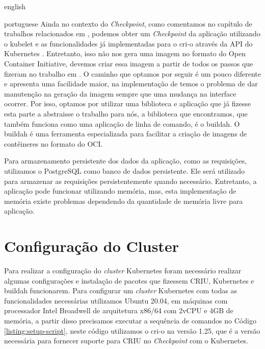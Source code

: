\begin{otherlanguage*}{english}
\begin{otherlanguage*}{portuguese}
Ainda no contexto do \textit{Checkpoint}, como comentamos no capítulo de trabalhos
relacionados em \cite{schmidttransparent}, podemos obter um \textit{Checkpoint} da
aplicação utilizando o kubelet e as funcionalidades já implementadas para o cri-o
através da API do Kubernetes \cite{kubernetes:container-checkpoint}. Entretanto,
isso não nos gera uma imagem no formato do Open Container Initiative, devemos criar
essa imagem a partir de todos os passos que fizeram no trabalho em
\cite{schmidttransparent}. O caminho que optamos por seguir é um pouco diferente e
apresenta uma facilidade maior, na implementação de \cite{schmidttransparent} temos
o problema de dar manutenção na geração da imagem sempre que uma mudança na interface
ocorrer. Por isso, optamos por utilizar uma biblioteca e aplicação que já fizesse esta
parte a abstraisse o trabalho para nós, a biblioteca que encontramos, que também
funciona como uma aplicação de linha de comando, é o buildah\cite{buildah}. O buildah é
uma ferramenta especializada para facilitar a criação de imagens de contêineres no formato
do OCI.

Para armazenamento persistente dos dados da aplicação, como as requisições, utilizamos
o PostgreSQL \cite{postgresql} como banco de dados persistente. Ele será utilizado para
armazenar as requisições persistentemente quando necessário. Entretanto, a aplicação
pode funcionar utilizando memória, mas, esta implementação de memória existe problemas
dependendo da quantidade de memória livre para aplicação.

\section{Configuração do Cluster}

Para realizar a configuração do \textit{cluster} Kubernetes foram necessário realizar
algumas configurações e instalação de pacotes que fizessem CRIU, Kubernetes e buildah
funcionarem. Para configurar um \textit{cluster} Kubernetes com todas as funcionalidades
necessárias utilizamos Ubuntu 20.04, em máquinas com processador Intel Broadwell de
arquitetura x86/64 com 2vCPU e 4GB de memória, a partir disso precisamos executar a
sequência de comandos no Código \ref{listing:setup-script}, neste código utilizamos
o cri-o na versão 1.25, que é a versão necessária para fornecer suporte para CRIU no
\textit{Checkpoint} com o Kubernetes.


\end{otherlanguage*}
\end{otherlanguage*}
